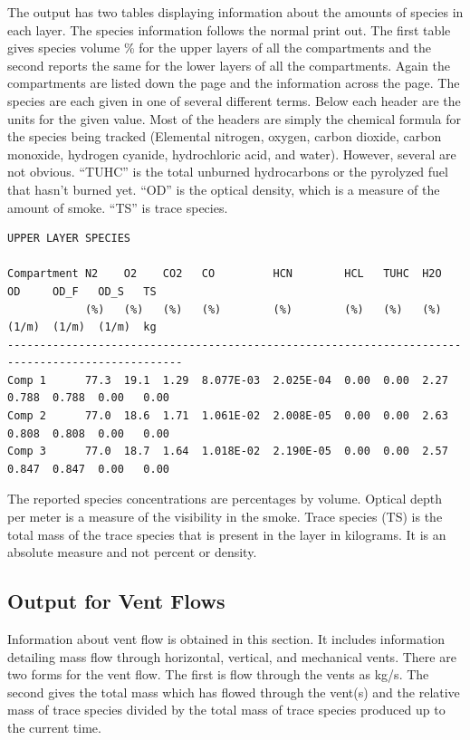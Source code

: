 The output has two tables displaying information about the amounts of species in each layer. The species information follows the normal print out.  The first table gives species volume \% for the upper layers of all the compartments and the second reports the same for the lower layers of all the compartments.  Again the compartments are listed down the page and the information across the page.  The species are each given in one of several different terms.  Below each header are the units for the given value.  Most of the headers are simply the chemical formula for the species being tracked (Elemental nitrogen, oxygen, carbon dioxide, carbon monoxide, hydrogen cyanide, hydrochloric acid, and water).  However, several are not obvious.  ``TUHC'' is the total unburned hydrocarbons or the pyrolyzed fuel that hasn't burned yet.  ``OD'' is the optical density, which is a measure of the amount of smoke. ``TS'' is trace species.

\begin{lstlisting}[basicstyle=\tiny]
UPPER LAYER SPECIES

Compartment N2    O2    CO2   CO         HCN        HCL   TUHC  H2O   OD     OD_F   OD_S   TS
            (%)   (%)   (%)   (%)        (%)        (%)   (%)   (%)   (1/m)  (1/m)  (1/m)  kg
-------------------------------------------------------------------------------------------------
Comp 1      77.3  19.1  1.29  8.077E-03  2.025E-04  0.00  0.00  2.27  0.788  0.788  0.00   0.00
Comp 2      77.0  18.6  1.71  1.061E-02  2.008E-05  0.00  0.00  2.63  0.808  0.808  0.00   0.00
Comp 3      77.0  18.7  1.64  1.018E-02  2.190E-05  0.00  0.00  2.57  0.847  0.847  0.00   0.00
\end{lstlisting}
The reported species concentrations are percentages by volume. Optical depth per meter is a measure of the visibility in the smoke. Trace species (TS) is the total mass of the trace species that is present in the layer in kilograms. It is an absolute measure and not percent or density.

\subsection{Output for Vent Flows}
Information about vent flow is obtained in this section.  It includes information detailing mass flow through horizontal, vertical, and mechanical vents. There are two forms for the vent flow. The first is flow through the vents as kg/s. The second gives the total mass which has flowed through the vent(s) and the relative mass of trace species divided by the total mass of trace species produced up to the current time.

